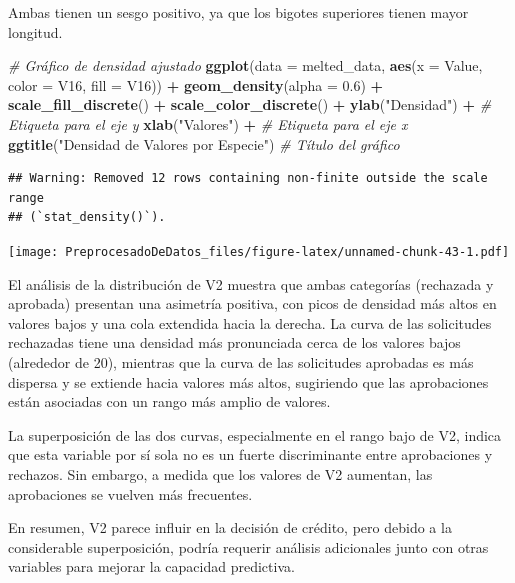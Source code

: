 \documentclass[
]{article}
\newenvironment{Shaded}{\begin{snugshade}}{\end{snugshade}}
\newcommand{\AttributeTok}[1]{\textcolor[rgb]{0.13,0.29,0.53}{#1}}
\newcommand{\CommentTok}[1]{\textcolor[rgb]{0.56,0.35,0.01}{\textit{#1}}}
\newcommand{\FloatTok}[1]{\textcolor[rgb]{0.00,0.00,0.81}{#1}}
\newcommand{\FunctionTok}[1]{\textcolor[rgb]{0.13,0.29,0.53}{\textbf{#1}}}
\newcommand{\NormalTok}[1]{#1}
\newcommand{\SpecialCharTok}[1]{\textcolor[rgb]{0.81,0.36,0.00}{\textbf{#1}}}
\newcommand{\StringTok}[1]{\textcolor[rgb]{0.31,0.60,0.02}{#1}}
\begin{document}
Ambas tienen un sesgo positivo, ya que los bigotes superiores tienen
mayor longitud.

\begin{Shaded}
\begin{Highlighting}[]
\CommentTok{\# Gráfico de densidad ajustado}
\FunctionTok{ggplot}\NormalTok{(}\AttributeTok{data =}\NormalTok{ melted\_data, }\FunctionTok{aes}\NormalTok{(}\AttributeTok{x =}\NormalTok{ Value, }\AttributeTok{color =}\NormalTok{ V16, }\AttributeTok{fill =}\NormalTok{ V16)) }\SpecialCharTok{+}
  \FunctionTok{geom\_density}\NormalTok{(}\AttributeTok{alpha =} \FloatTok{0.6}\NormalTok{) }\SpecialCharTok{+}
  \FunctionTok{scale\_fill\_discrete}\NormalTok{() }\SpecialCharTok{+}
  \FunctionTok{scale\_color\_discrete}\NormalTok{() }\SpecialCharTok{+}
  \FunctionTok{ylab}\NormalTok{(}\StringTok{"Densidad"}\NormalTok{) }\SpecialCharTok{+}  \CommentTok{\# Etiqueta para el eje y}
  \FunctionTok{xlab}\NormalTok{(}\StringTok{"Valores"}\NormalTok{) }\SpecialCharTok{+}   \CommentTok{\# Etiqueta para el eje x}
  \FunctionTok{ggtitle}\NormalTok{(}\StringTok{"Densidad de Valores por Especie"}\NormalTok{)  }\CommentTok{\# Título del gráfico}
\end{Highlighting}
\end{Shaded}

\begin{verbatim}
## Warning: Removed 12 rows containing non-finite outside the scale range
## (`stat_density()`).
\end{verbatim}

\texttt{[image: PreprocesadoDeDatos\_files/figure-latex/unnamed-chunk-43-1.pdf]}

El análisis de la distribución de V2 muestra que ambas categorías
(rechazada y aprobada) presentan una asimetría positiva, con picos de
densidad más altos en valores bajos y una cola extendida hacia la
derecha. La curva de las solicitudes rechazadas tiene una densidad más
pronunciada cerca de los valores bajos (alrededor de 20), mientras que
la curva de las solicitudes aprobadas es más dispersa y se extiende
hacia valores más altos, sugiriendo que las aprobaciones están asociadas
con un rango más amplio de valores.

La superposición de las dos curvas, especialmente en el rango bajo de
V2, indica que esta variable por sí sola no es un fuerte discriminante
entre aprobaciones y rechazos. Sin embargo, a medida que los valores de
V2 aumentan, las aprobaciones se vuelven más frecuentes.

En resumen, V2 parece influir en la decisión de crédito, pero debido a
la considerable superposición, podría requerir análisis adicionales
junto con otras variables para mejorar la capacidad predictiva.
\end{document}
